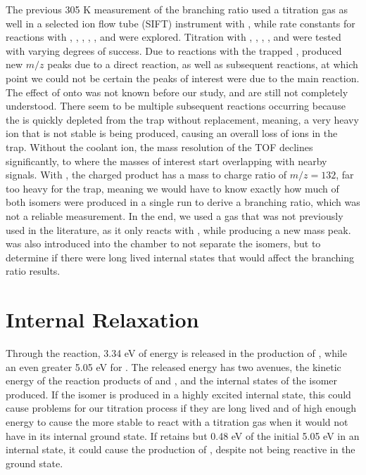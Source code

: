 The previous 305 K measurement of the branching ratio used a titration gas as well in a selected ion flow tube (SIFT) instrument with , while rate constants for reactions with , , , , , and  were explored.\cite{Love1987,Freeman1987} Titration with , , , , and  were tested with varying degrees of success. Due to reactions with the trapped ,  produced new $m/z$ peaks due to a direct reaction, as well as subsequent reactions, at which point we could not be certain the peaks of interest were due to the main reaction. The effect of  onto  was not known before our study, and are still not completely understood. There seem to be multiple subsequent reactions occurring because the  is quickly depleted from the trap without replacement, meaning, a very heavy ion that is not stable is being produced, causing an overall loss of ions in the trap. Without the coolant ion, the mass resolution of the TOF declines significantly, to where the masses of interest start overlapping with nearby signals. With , the charged product  has a mass to charge ratio of $m/z=132$, far too heavy for the trap, meaning we would have to know exactly how much of both isomers were produced in a single run to derive a branching ratio, which was not a reliable measurement. In the end, we used a gas that was not previously used in the literature,  as it only reacts with , while producing a new mass peak.  was also introduced into the chamber to not separate the isomers, but to determine if there were long lived internal states that would affect the branching ratio results.

\section{Internal Relaxation} \label{sec: internal relaxation}

Through the  reaction, 3.34 eV of energy is released in the production of , while an even greater 5.05 eV for . The released energy has two avenues, the kinetic energy of the reaction products of \ce{[HCO]+} and , and the internal states of the isomer produced. If the isomer is produced in a highly excited internal state, this could cause problems for our titration process if they are long lived and of high enough energy to cause the more stable  to react with a titration gas  when it would not have in its internal ground state. If  retains but 0.48 eV of the initial 5.05 eV in an internal state, it could cause the production of , despite not being reactive in the ground state.

